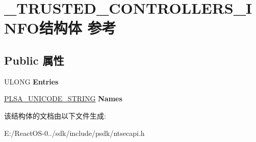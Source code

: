 \hypertarget{struct___t_r_u_s_t_e_d___c_o_n_t_r_o_l_l_e_r_s___i_n_f_o}{}\section{\+\_\+\+T\+R\+U\+S\+T\+E\+D\+\_\+\+C\+O\+N\+T\+R\+O\+L\+L\+E\+R\+S\+\_\+\+I\+N\+F\+O结构体 参考}
\label{struct___t_r_u_s_t_e_d___c_o_n_t_r_o_l_l_e_r_s___i_n_f_o}
\subsection*{Public 属性}
\begin{DoxyCompactItemize}
\item 
\mbox{\label{struct___t_r_u_s_t_e_d___c_o_n_t_r_o_l_l_e_r_s___i_n_f_o_ab8971fcb394986bfd53dde215a319cb7}} 
U\+L\+O\+NG {\bfseries Entries}
\item 
\mbox{\label{struct___t_r_u_s_t_e_d___c_o_n_t_r_o_l_l_e_r_s___i_n_f_o_a48eaabc80020487b1a33083c6498948d}} 
\hyperlink{struct___l_s_a___u_n_i_c_o_d_e___s_t_r_i_n_g}{P\+L\+S\+A\+\_\+\+U\+N\+I\+C\+O\+D\+E\+\_\+\+S\+T\+R\+I\+NG} {\bfseries Names}
\end{DoxyCompactItemize}


该结构体的文档由以下文件生成\+:\begin{DoxyCompactItemize}
\item 
E\+:/\+React\+O\+S-\/0../sdk/include/psdk/ntsecapi.\+h\end{DoxyCompactItemize}
